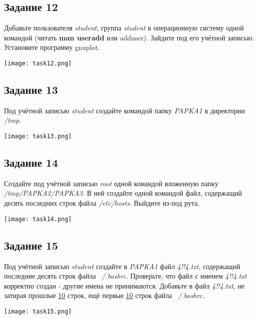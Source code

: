 \documentclass[12pt, a4paper]{report}
\begin{document}
			\subsection*{Задание 12}
			Добавьте пользователя \textit{student}, группа \textit{student} в операционную систему одной командой (читать \textbf{man useradd} или adduser). Зайдите под его учётной записью. Установите программу gnuplot.
			\lstset{style=mystyle}
			
			\begin{center}
				\texttt{[image: task12.png]}
			\end{center}

			\subsection*{Задание 13}
			Под учётной записью \textit{student} создайте командой папку \textit{PAPKA1} в директории \textit{/tmp}.
			\lstset{style=mystyle}
			
			\begin{center}
				\texttt{[image: task13.png]}
			\end{center}

			\subsection*{Задание 14}
			Создайте под учётной записью \textit{root} одной командой вложенную папку \textit{/tmp/PAPKA2/PAPKA3}. В ней создайте одной командой файл, содержащий десять последних строк файла \textit{/etc/hosts}. Выйдите из-под рута.
			\lstset{style=mystyle}
			
			\begin{center}
				\texttt{[image: task14.png]}
			\end{center}

			\subsection*{Задание 15}
			Под учётной записью \textit{student} создайте в \textit{PAPKA1} файл \textit{4!!4.txt}, содержащий последние десять строк файла \textit{~/.bashrc}. Проверьте, что файл с именем \textit{4!!4.txt} корректно создан - другие имена не принимаются. Добавьте в файл \textit{4!!4.txt}, не затирая прошлые \underline{10} строк, ещё первые \underline{10} строк файла \textit{~/.bashrc}.
			\lstset{style=mystyle}
			
			\begin{center}
				\texttt{[image: task15.png]}
			\end{center}
\end{document}
